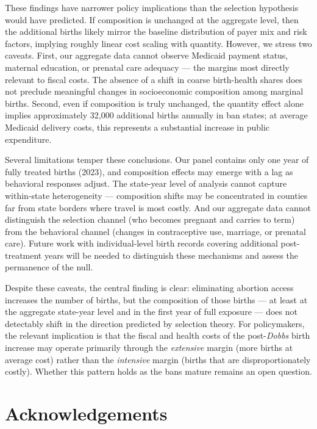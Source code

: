 \documentclass[12pt]{article}
\begin{document}
These findings have narrower policy implications than the selection hypothesis would have predicted. If composition is unchanged at the aggregate level, then the additional births likely mirror the baseline distribution of payer mix and risk factors, implying roughly linear cost scaling with quantity. However, we stress two caveats. First, our aggregate data cannot observe Medicaid payment status, maternal education, or prenatal care adequacy --- the margins most directly relevant to fiscal costs. The absence of a shift in coarse birth-health shares does not preclude meaningful changes in socioeconomic composition among marginal births. Second, even if composition is truly unchanged, the quantity effect alone implies approximately 32,000 additional births annually in ban states; at average Medicaid delivery costs, this represents a substantial increase in public expenditure.

Several limitations temper these conclusions. Our panel contains only one year of fully treated births (2023), and composition effects may emerge with a lag as behavioral responses adjust. The state-year level of analysis cannot capture within-state heterogeneity --- composition shifts may be concentrated in counties far from state borders where travel is most costly. And our aggregate data cannot distinguish the selection channel (who becomes pregnant and carries to term) from the behavioral channel (changes in contraceptive use, marriage, or prenatal care). Future work with individual-level birth records covering additional post-treatment years will be needed to distinguish these mechanisms and assess the permanence of the null.

Despite these caveats, the central finding is clear: eliminating abortion access increases the number of births, but the composition of those births --- at least at the aggregate state-year level and in the first year of full exposure --- does not detectably shift in the direction predicted by selection theory. For policymakers, the relevant implication is that the fiscal and health costs of the post-\emph{Dobbs} birth increase may operate primarily through the \emph{extensive} margin (more births at average cost) rather than the \emph{intensive} margin (births that are disproportionately costly). Whether this pattern holds as the bans mature remains an open question.

\section*{Acknowledgements}
\end{document}
